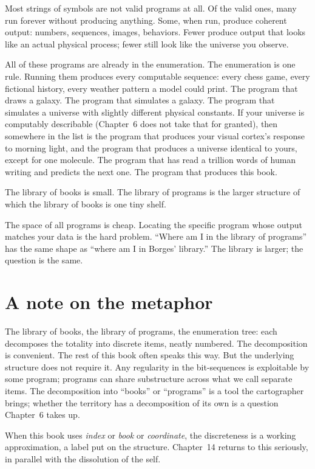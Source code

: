 Most strings of symbols are not valid programs at all. Of the valid ones, many run forever without producing anything. Some, when run, produce coherent output: numbers, sequences, images, behaviors. Fewer produce output that looks like an actual physical process; fewer still look like the universe you observe.

All of these programs are already in the enumeration. The enumeration is one rule. Running them produces every computable sequence: every chess game, every fictional history, every weather pattern a model could print. The program that draws a galaxy. The program that simulates a galaxy. The program that simulates a universe with slightly different physical constants. If your universe is computably describable (Chapter~6 does not take that for granted), then somewhere in the list is the program that produces your visual cortex's response to morning light, and the program that produces a universe identical to yours, except for one molecule. The program that has read a trillion words of human writing and predicts the next one. The program that produces this book.

The library of books is small. The library of programs is the larger structure of which the library of books is one tiny shelf.

The space of all programs is cheap. Locating the specific program whose output matches your data is the hard problem. ``Where am I in the library of programs'' has the same shape as ``where am I in Borges' library.'' The library is larger; the question is the same.

\section*{A note on the metaphor}

The library of books, the library of programs, the enumeration tree: each decomposes the totality into discrete items, neatly numbered. The decomposition is convenient. The rest of this book often speaks this way. But the underlying structure does not require it. Any regularity in the bit-sequences is exploitable by some program; programs can share substructure across what we call separate items. The decomposition into ``books'' or ``programs'' is a tool the cartographer brings; whether the territory has a decomposition of its own is a question Chapter~6 takes up.

When this book uses \emph{index} or \emph{book} or \emph{coordinate}, the discreteness is a working approximation, a label put on the structure. Chapter~14 returns to this seriously, in parallel with the dissolution of the self.

